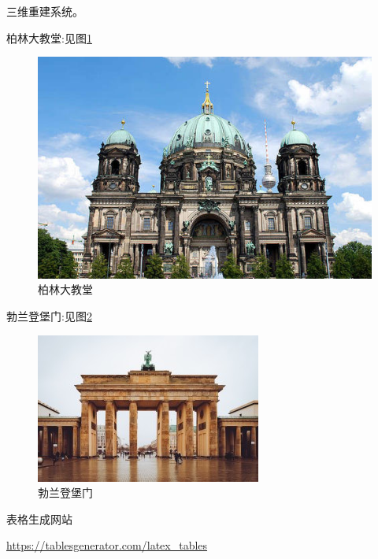 \documentclass[12pt]{ctexbook}  %
\begin{document}
	三维重建系统。

	柏林大教堂:见图\ref{berlin}

	\begin{figure}[htbp]
		\centering
		\includegraphics[scale=0.1]{0}
		\caption{柏林大教堂}
		\label{berlin}
	\end{figure}


	勃兰登堡门:见图\ref{wei}
	
	\begin{figure}[h]
		\centering
		\includegraphics[scale=1.0]{1}
		\caption{勃兰登堡门}
		\label{wei}
	\end{figure}
	
	表格生成网站
	
	\url{https://tablesgenerator.com/latex_tables}
	
\end{document}
